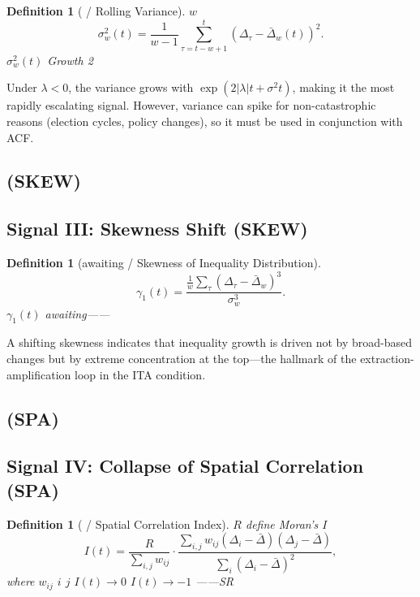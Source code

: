\documentclass[11pt,a4paper]{article}
\newtheorem{definition}[theorem]{Definition}
\theoremstyle{remark}
\newcommand{\paren}[1]{\left(#1\right)}
\newcommand{\ineq}{\Delta}
\newcommand{\lambdaparam}{\lambda}
\begin{document}
\begin{definition}[ / Rolling Variance]
\label{def:var}
 $w$ 
\[
\sigma_w^2(t) = \frac{1}{w-1} \sum_{\tau = t-w+1}^{t} 
                \paren{\ineq_{\tau} - \bar{\ineq}_w(t)}^2.
\]
\textbf{} $\sigma_w^2(t)$ Growth 2 
\end{definition}

Under $\lambdaparam < 0$, the variance grows with $\exp(2|\lambdaparam| t + \sigma^2 t)$,
making it the most rapidly escalating signal. However, variance can spike for
non-catastrophic reasons (election cycles, policy changes), so it must be used in
conjunction with ACF.

\subsection{ (SKEW)}
\subsection{Signal III: Skewness Shift (SKEW)}

\begin{definition}[awaiting / Skewness of Inequality Distribution]
\label{def:skew}
\[
\gamma_1(t) = \frac{\frac{1}{w} \sum_{\tau} (\ineq_{\tau} - \bar{\ineq}_w)^3}
                     {\sigma_w^3}.
\]
\textbf{} $\gamma_1(t)$ 
awaiting——
\end{definition}

A shifting skewness indicates that inequality growth is driven not by broad-based
changes but by extreme concentration at the top—the hallmark of the extraction-
amplification loop in the ITA condition.

\subsection{ (SPA)}
\subsection{Signal IV: Collapse of Spatial Correlation (SPA)}

\begin{definition}[ / Spatial Correlation Index]
\label{def:spa}
 $R$ define Moran's $I$ 
\[
I(t) = \frac{R}{\sum_{i,j} w_{ij}} \cdot
       \frac{\sum_{i,j} w_{ij} (\ineq_i - \bar{\ineq})(\ineq_j - \bar{\ineq})}
            {\sum_i (\ineq_i - \bar{\ineq})^2},
\]
where $w_{ij}$  $i$  $j$ 
\textbf{} $I(t) \to 0$  $I(t) \to -1$
——SR 
\end{definition}
\end{document}

